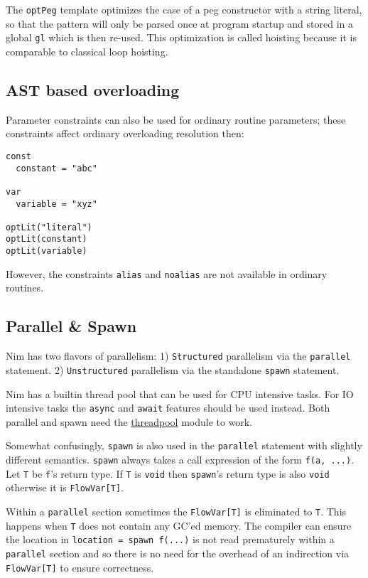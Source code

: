 The \texttt{optPeg} template optimizes the case of a peg constructor
with a string literal, so that the pattern will only be parsed once at
program startup and stored in a global \texttt{gl} which is then
re-used. This optimization is called hoisting because it is comparable
to classical loop hoisting.

\hypertarget{ast-based-overloading}{%
\subsection{AST based overloading}\label{ast-based-overloading}}

Parameter constraints can also be used for ordinary routine parameters;
these constraints affect ordinary overloading resolution then:

\begin{verbatim}
const
  constant = "abc"

var
  variable = "xyz"

optLit("literal")
optLit(constant)
optLit(variable)
\end{verbatim}

However, the constraints \texttt{alias} and \texttt{noalias} are not
available in ordinary routines.

\hypertarget{parallel-spawn}{%
\subsection{Parallel \& Spawn}\label{parallel-spawn}}

Nim has two flavors of parallelism: 1) \texttt{Structured} parallelism
via the \texttt{parallel} statement. 2) \texttt{Unstructured}
parallelism via the standalone \texttt{spawn} statement.

Nim has a builtin thread pool that can be used for CPU intensive tasks.
For IO intensive tasks the \texttt{async} and \texttt{await} features
should be used instead. Both parallel and spawn need the
\href{threadpool.html}{threadpool} module to work.

Somewhat confusingly, \texttt{spawn} is also used in the
\texttt{parallel} statement with slightly different semantics.
\texttt{spawn} always takes a call expression of the form
\texttt{f(a,\ ...)}. Let \texttt{T} be \texttt{f}'s return type. If
\texttt{T} is \texttt{void} then \texttt{spawn}'s return type is also
\texttt{void} otherwise it is \texttt{FlowVar{[}T{]}}.

Within a \texttt{parallel} section sometimes the \texttt{FlowVar{[}T{]}}
is eliminated to \texttt{T}. This happens when \texttt{T} does not
contain any GC'ed memory. The compiler can ensure the location in
\texttt{location\ =\ spawn\ f(...)} is not read prematurely within a
\texttt{parallel} section and so there is no need for the overhead of an
indirection via \texttt{FlowVar{[}T{]}} to ensure correctness.

